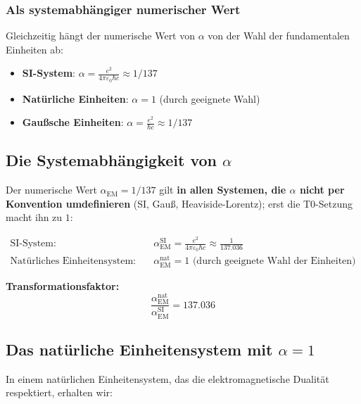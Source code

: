 \subsubsection{Als systemabhängiger numerischer Wert}
\label{subsubsec:system_dependent}

Gleichzeitig hängt der numerische Wert von $\alpha$ von der Wahl der fundamentalen Einheiten ab:

\begin{itemize}
	\item \textbf{SI-System}: $\alpha = \frac{e^2}{4\pi\varepsilon_0\hbar c} \approx 1/137$
	\item \textbf{Natürliche Einheiten}: $\alpha = 1$ (durch geeignete Wahl)
	\item \textbf{Gaußsche Einheiten}: $\alpha = \frac{e^2}{\hbar c} \approx 1/137$
\end{itemize}

\subsection{Die Systemabhängigkeit von $\alpha$}
\label{subsec:alpha_system_dependency}

Der numerische Wert $\alpha_{\text{EM}} = 1/137$ gilt \textbf{in allen Systemen, die $\alpha$ nicht per Konvention umdefinieren} (SI, Gauß, Heaviside-Lorentz); erst die T0-Setzung macht ihn zu $1$:

\begin{align}
	\text{SI-System:} \quad &\alpha_{\text{EM}}^{\text{SI}} = \frac{e^2}{4\pi\varepsilon_0\hbar c} \approx \frac{1}{137.036} \\
	\text{Natürliches Einheitensystem:} \quad &\alpha_{\text{EM}}^{\text{nat}} = 1 \text{ (durch geeignete Wahl der Einheiten)}
\end{align}

\textbf{Transformationsfaktor:}
\begin{equation}
	\frac{\alpha_{\text{EM}}^{\text{nat}}}{\alpha_{\text{EM}}^{\text{SI}}} = 137.036
\end{equation}

\subsection{Das natürliche Einheitensystem mit $\alpha = 1$}
\label{subsec:natural_units}

In einem natürlichen Einheitensystem, das die elektromagnetische Dualität respektiert, erhalten wir:

